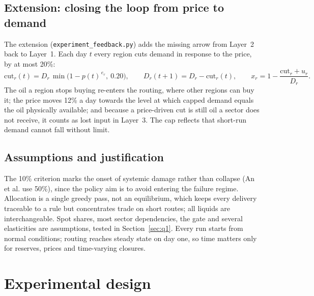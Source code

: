 \documentclass[11pt,a4paper]{article}
\begin{document}
\subsection{Extension: closing the loop from price to demand}\label{sec:extmodel}

The extension (\texttt{experiment\_feedback.py}) adds the missing arrow from Layer~2 back to Layer~1. Each day $t$ every region cuts demand in response to the price, by at most 20\%:
\begin{equation}\label{eq:ext}
\text{cut}_r(t) = D_r\,\min\bigl(1-p(t)^{\,e_r},\ 0.20\bigr), \qquad D_r(t+1) = D_r-\text{cut}_r(t), \qquad x_r = 1-\frac{\text{cut}_r+u_r}{D_r}.
\end{equation}
The oil a region stops buying re-enters the routing, where other regions can buy it; the price moves 12\% a day towards the level at which capped demand equals the oil physically available; and because a price-driven cut is still oil a sector does not receive, it counts as lost input in Layer~3. The cap reflects that short-run demand cannot fall without limit.

\subsection{Assumptions and justification}

The 10\% criterion marks the onset of systemic damage rather than collapse (An et al. use 50\%), since the policy aim is to avoid entering the failure regime. Allocation is a single greedy pass, not an equilibrium, which keeps every delivery traceable to a rule but concentrates trade on short routes; all liquids are interchangeable. Spot shares, most sector dependencies, the gate and several elasticities are assumptions, tested in Section~\ref{sec:q1}. Every run starts from normal conditions; routing reaches steady state on day one, so time matters only for reserves, prices and time-varying closures.


\section{Experimental design}
\end{document}
